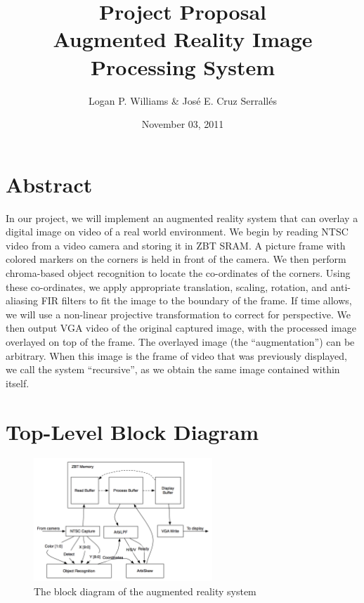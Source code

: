 \documentclass[10pt]{article}
\begin{document}
\title{Project Proposal\\Augmented Reality Image Processing System}
\author{Logan P. Williams \& Jos\'{e} E. Cruz Serrall\'{e}s}
\date{November 03, 2011}
\maketitle

\section{Abstract}
In our project, we will implement an augmented reality system that can overlay a digital image on video of a real world environment. We begin by reading NTSC video from a video camera and storing it in ZBT SRAM. A picture frame with colored markers on the corners is held in front of the camera. We then perform chroma-based object recognition to locate the co-ordinates of the corners. Using these co-ordinates, we apply appropriate translation, scaling, rotation, and anti-aliasing FIR filters to fit the image to the boundary of the frame. If time allows, we will use a non-linear projective transformation to correct for perspective. We then output VGA video of the original captured image, with the processed image overlayed on top of the frame. The overlayed image (the ``augmentation'') can be arbitrary. When this image is the frame of video that was previously displayed, we call the system ``recursive'', as we obtain the same image contained within itself.
\newpage
\section{Top-Level Block Diagram}
\begin{figure}[h!]
\centering
\includegraphics[width=0.6\textwidth]{block_diagram.png}
\caption{The block diagram of the augmented reality system}
\end{figure}
\end{document}
